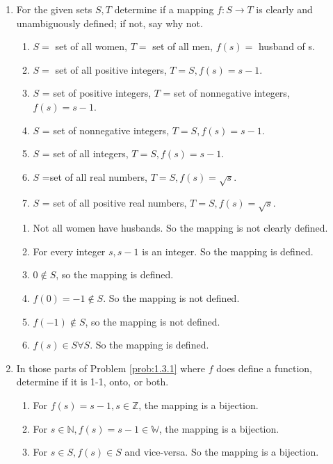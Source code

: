 \renewcommand{\theequation}{\theenumi}

\begin{enumerate}[label=\arabic*.,ref=\thesubsection.\theenumi]

	\item For the given sets $S, T$ determine if a mapping $f:S\to T$ is clearly and unambiguously defined; if not, say why not.
		\label{prob:1.3.1}
\begin{enumerate}
	\item $S =$ set of all women, $T = $ set of all men, $f(s) = $ husband of s.
	\item $S = $ set of all positive integers, $T = S, f(s) = s-1$.
	\item $S$ = set of positive integers, $T$ = set of nonnegative integers, $f(s) = s -1$.
	\item $S$ = set of nonnegative integers, $T = S, f(s) = s - 1$.
	\item $S$ = set of all integers, $T = S, f(s) = s - 1$.
	\item  $S$ =set of all real numbers, $T = S, f(s) = \sqrt{s}$.
	\item	$S$ = set of all positive real numbers, $T = S, f(s) = \sqrt{s}$.	
\end{enumerate}
\solution
\begin{enumerate}
	\item Not all women have husbands.  So the mapping is not clearly defined.
	\item For every integer $s, s-1$ is an integer.  So the mapping is defined.
	\item $0 \notin S$, so the mapping is defined.
	\item $f(0) = -1 \notin S$.  So the mapping is not defined.
	\item $f(-1) \notin S$, so the mapping is not defined.
	\item $f(s) \in S \forall S$.  So the mapping is defined.
\end{enumerate}
\item 
	In those parts of Problem  
		\ref{prob:1.3.1}
where $f$ does define a function, determine if it is 1-1, onto, or both.
\solution
\begin{enumerate}
	\item For $f(s) = s-1, s \in \mathbb{Z}$, the mapping is a bijection.
	\item For $s \in \mathbb{N}, f(s) = s-1 \in  \mathbb{W}$, the mapping is a bijection.
	\item For $s \in S, f(s) \in S$ and vice-versa.  So the mapping is a bijection.

\end{enumerate}
\end{enumerate}
